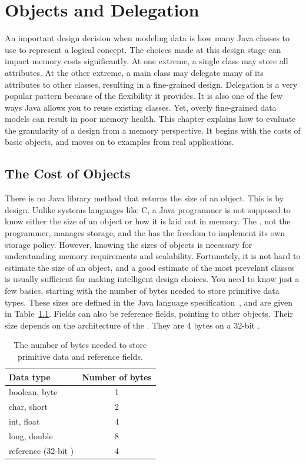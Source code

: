 \chapter{Objects and Delegation}
\label{chapter:delegation}

An important design decision when modeling data is how many Java classes to use to represent a logical concept.
The choices made at this design stage can impact memory costs significantly. At one extreme, a single class may store
all attributes. At the other extreme, a main class may delegate many of its attributes to other classes,
resulting in a fine-grained design. Delegation is a very popular pattern because of the flexibility it provides.
It is also one of the few ways Java allows you to reuse existing classes. Yet, overly fine-grained data models
can result in poor memory health. This chapter explains how to evaluate the granularity of a design from a memory perspective.
It begins with the costs of basic objects, and moves on to examples from real applications.
  
\section{The Cost of Objects}
\label{sec:CostOfObjects}

There is no Java library method that returns the size of an object. This is by
design. Unlike systems languages like C, a Java programmer is not supposed to
know either the size of an object or how it is laid out in memory. The \jre,
not the programmer, manages storage, and the \jre has the freedom to implement
its own storage policy. However, knowing the sizes of objects is necessary for understanding
memory requirements and scalability. Fortunately, it is not hard to estimate the size of an object,
and a good estimate of the most prevelant classes is usually sufficient for making intelligent design choices.
You need to know just a few basics, starting with the number of bytes needed to store primitive data types.
These sizes are defined in the Java language specification~\cite{JavaSpec}, and are given in Table~\ref{tab:primitive-sizes}.
Fields can also be reference fields, pointing to other objects. Their size
depends on the architecture of the \jre. They are 4 bytes on a 32-bit \jre.
\begin{table}
  \centering
\begin{tabular}{lc} \toprule
	Data type & Number of bytes \\ \midrule
	boolean, byte & 1 \\
	char, short & 2 \\
	int, float & 4 \\
	long, double & 8 \\
	reference (32-bit \jre) & 4 \\
	\bottomrule
\end{tabular}
  \caption{The number of bytes needed to store primitive data and reference
  fields.}
  \label{tab:primitive-sizes}
\end{table}

